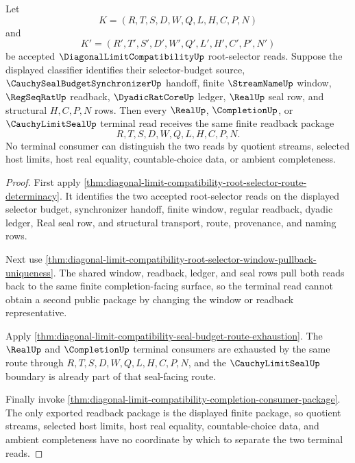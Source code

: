\begin{theorem}
\label{thm:diagonal-limit-compatibility-terminal-readback-determinacy}
Let
$$
K=(R,T,S,D,W,Q,L,H,C,P,N)
$$
and
$$
K'=(R',T',S',D',W',Q',L',H',C',P',N')
$$
be accepted $\DiagonalLimitCompatibilityUp$ root-selector reads. Suppose the displayed classifier identifies their selector-budget source, $\CauchySealBudgetSynchronizerUp$ handoff, finite $\StreamNameUp$ window, $\RegSeqRatUp$ readback, $\DyadicRatCoreUp$ ledger, $\RealUp$ seal row, and structural $H,C,P,N$ rows. Then every $\RealUp$, $\CompletionUp$, or $\CauchyLimitSealUp$ terminal read receives the same finite readback package
$$
R,T,S,D,W,Q,L,H,C,P,N .
$$
No terminal consumer can distinguish the two reads by quotient streams, selected host limits, host real equality, countable-choice data, or ambient completeness.
\end{theorem}
\begin{proof}
First apply \autoref{thm:diagonal-limit-compatibility-root-selector-route-determinacy}. It identifies the two accepted root-selector reads on the displayed selector budget, synchronizer handoff, finite window, regular readback, dyadic ledger, Real seal row, and structural transport, route, provenance, and naming rows.

Next use \autoref{thm:diagonal-limit-compatibility-root-selector-window-pullback-uniqueness}. The shared window, readback, ledger, and seal rows pull both reads back to the same finite completion-facing surface, so the terminal read cannot obtain a second public package by changing the window or readback representative.

Apply \autoref{thm:diagonal-limit-compatibility-seal-budget-route-exhaustion}. The $\RealUp$ and $\CompletionUp$ terminal consumers are exhausted by the same route through $R,T,S,D,W,Q,L,H,C,P,N$, and the $\CauchyLimitSealUp$ boundary is already part of that seal-facing route.

Finally invoke \autoref{thm:diagonal-limit-compatibility-completion-consumer-package}. The only exported readback package is the displayed finite package, so quotient streams, selected host limits, host real equality, countable-choice data, and ambient completeness have no coordinate by which to separate the two terminal reads.
\end{proof}

